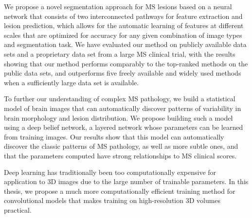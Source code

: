 We propose a novel segmentation approach for MS lesions based on a neural
network that consists of two interconnected pathways for feature extraction and
lesion prediction, which allows for the automatic learning of features at
different scales that are optimized for accuracy for any given combination of
image types and segmentation task. We have evaluated our method on publicly
available data sets and a proprietary data set from a large MS clinical trial,
with the results showing that our method performs comparably to the top-ranked
methods on the public data sets, and outperforms five freely available and
widely used methods when a sufficiently large data set is available.


To further our understanding of complex MS pathology, we build a statistical
model of brain images that can automatically discover patterns of variability in
brain morphology and lesion distribution. We propose building such a model using
a deep belief network, a layered network whose parameters can be learned
from training images.
Our results show that this model can automatically discover the classic patterns
of MS pathology, as well as more subtle ones, and that the parameters computed
have strong relationships to MS clinical scores.

Deep learning has traditionally been too computationally expensive for
application to 3D images due to the large number of trainable parameters. In
this thesis, we propose a much more computationally efficient training method
for convolutional models that makes training on high-resolution 3D volumes
practical.


